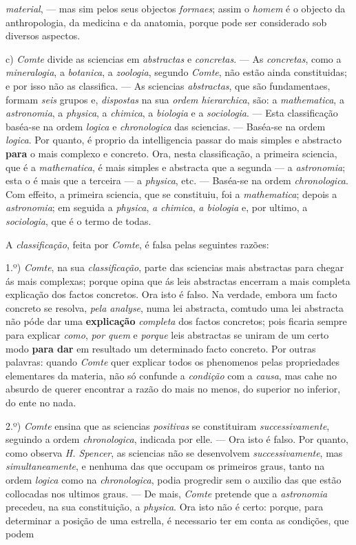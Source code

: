 \emph{material}, --- mas sim pelos seus objectos \emph{formaes}; assim o \emph{homem} é o objecto da anthropologia, da medicina e da anatomia, porque pode ser considerado sob diversos aspectos.\par c) \emph{Comte} divide as sciencias em \emph{abstractas} e \emph{concretas}. --- As \emph{concretas}, como a \emph{mineralogia}, a \emph{botanica}, a \emph{zoologia}, segundo \emph{Comte}, não estão ainda constituidas; e por isso não as classifica. --- As sciencias \emph{abstractas}, que são fundamentaes, formam \emph{seis} grupos e, \emph{dispostas} na sua \emph{ordem hierarchica}, são: a \emph{mathematica}, a \emph{astronomia}, a \emph{physica}, a \emph{chimica}, a \emph{biologia} e a \emph{sociologia}. --- Esta classificação baséa-se na ordem \emph{logica} e \emph{chronologica} das sciencias. --- Baséa-se na ordem \emph{logica}. Por quanto, é proprio da intelligencia passar do mais simples e abstracto \textbf{para} o mais complexo e concreto. Ora, nesta classificação, a primeira sciencia, que é a \emph{mathematica}, é mais simples e abstracta que a segunda --- a \emph{astronomia}; esta o é mais que a terceira --- a \emph{physica}, etc. --- Baséa-se na ordem \emph{chronologica}. Com effeito, a primeira sciencia, que se constituiu, foi a \emph{mathematica}; depois a \emph{astronomia}; em seguida a \emph{physica}, \emph{a chimica}, \emph{a biologia} e, por ultimo, a \emph{sociologia}, que é o termo de todas.\par A \emph{classificação}, feita por \emph{Comte}, é falsa pelas seguintes razões:\par 1.º) \emph{Comte}, na sua \emph{classificação}, parte das sciencias mais abstractas para chegar ás mais complexas; porque opina que ás leis abstractas encerram a mais completa explicação dos factos concretos. Ora isto é falso. Na verdade, embora um facto concreto se resolva, \emph{pela analyse}, numa lei abstracta, comtudo uma lei abstracta não póde dar uma \textbf{explicação} \emph{completa} dos factos concretos; pois ficaria sempre para explicar \emph{como}, \emph{por quem} e \emph{porque} leis abstractas se uniram de um certo modo \textbf{para dar} em resultado um determinado facto concreto. Por outras palavras: quando \emph{Comte} quer explicar todos os phenomenos pelas propriedades elementares da materia, não só confunde a \emph{condição} com a \emph{causa}, mas cahe no absurdo de querer encontrar a razão do mais no menos, do superior no inferior, do ente no nada.\par 2.º) \emph{Comte} ensina que as sciencias \emph{positivas} se constituiram \emph{successivamente}, seguindo a ordem \emph{chronologica}, indicada por elle. --- Ora isto é falso. Por quanto, como observa \emph{H. Spencer}, as sciencias não se desenvolvem \emph{successivamente}, mas \emph{simultaneamente}, e nenhuma das que occupam os primeiros graus, tanto na ordem \emph{logica} como na \emph{chronologica}, podia progredir sem o auxilio das que estão collocadas nos ultimos graus. --- De mais, \emph{Comte} pretende que a \emph{astronomia} precedeu, na sua constituição, a \emph{physica}. Ora isto não é certo: porque, para determinar a posição de uma estrella, é necessario ter em conta as condições, que podem 